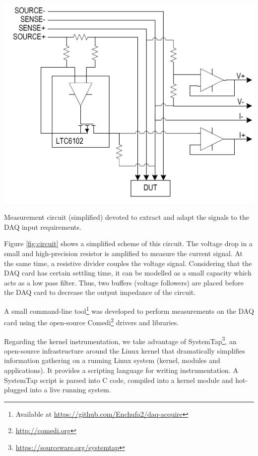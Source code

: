 \documentclass[twoside,nohyper]{tufte-book}
\theoremstyle{definition}
\theoremstyle{definition}
\theoremstyle{definition}
\theoremstyle{remark}
\begin{document}
\begin{marginfigure}[-1cm]

{\centering \includegraphics[width=1\linewidth]{img/03/circuit} 

}

\caption[Measurement circuit (simplified) devoted to extract and
adapt the signals to the DAQ input requirements.]{Measurement circuit (simplified) devoted to extract and
adapt the signals to the DAQ input requirements.}\label{fig:circuit}
\end{marginfigure}

Figure \ref{fig:circuit} shows a simplified scheme of this circuit. The
voltage drop in a small and high-precision resistor is amplified to
measure the current signal. At the same time, a resistive divider
couples the voltage signal. Considering that the DAQ card has certain
settling time, it can be modelled as a small capacity which acts as a
low pass filter. Thus, two buffers (voltage followers) are placed before
the DAQ card to decrease the output impedance of the
circuit\cite[0pt]{ni2014}.

A small command-line tool\footnote{Available at
  \url{https://github.com/Enchufa2/daq-acquire}} was developed to
perform measurements on the DAQ card using the open-source
Comedi\footnote{\url{http://comedi.org}} drivers and libraries.

Regarding the kernel instrumentation, we take advantage of
SystemTap\footnote{\href{(https://sourceware.org/systemtap)}{https://sourceware.org/systemtap}},
an open-source infrastructure around the Linux kernel that dramatically
simplifies information gathering on a running Linux system (kernel,
modules and applications). It provides a scripting language for writing
instrumentation. A SystemTap script is parsed into C code, compiled into
a kernel module and hot-plugged into a live running system.
\end{document}
